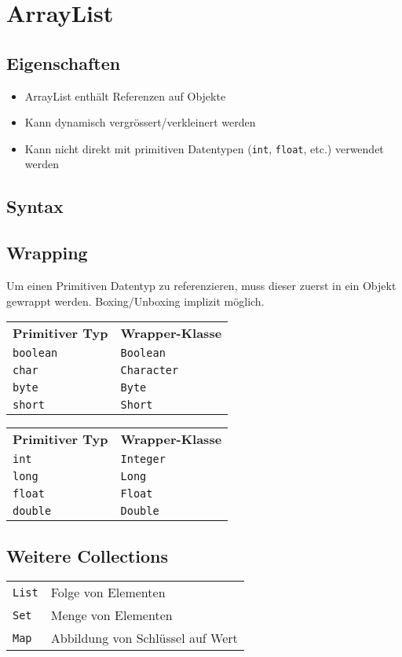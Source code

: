 \section{ArrayList}
\subsection{Eigenschaften}
\begin{itemize}
    \item ArrayList enthält Referenzen auf Objekte
    \item Kann dynamisch vergrössert/verkleinert werden
    \item Kann nicht direkt mit primitiven Datentypen (\lstinline{int}, \lstinline{float}, etc.) verwendet werden
\end{itemize}

\subsection{Syntax}



\subsection{Wrapping}
Um einen Primitiven Datentyp zu referenzieren, muss dieser zuerst in ein Objekt gewrappt werden.
Boxing/Unboxing implizit möglich.
\vspace{-0.5\abovedisplayskip}
\begin{center}
    \begin{tabularx}{0.45\columnwidth}{@{}l l@{}}
        \textbf{Primitiver Typ} & \textbf{Wrapper-Klasse}\\\hhline{==}
        \lstinline{boolean} & \lstinline{Boolean}\\\hhline{--}
        \lstinline{char} & \lstinline{Character}\\\hhline{--}
        \lstinline{byte} & \lstinline{Byte}\\\hhline{--}
        \lstinline{short} & \lstinline{Short}\\
    \end{tabularx}
    \begin{tabularx}{0.45\columnwidth}{@{}l l@{}}
        \textbf{Primitiver Typ} & \textbf{Wrapper-Klasse}\\\hhline{==}
        \lstinline{int} & \lstinline{Integer}\\\hhline{--}
        \lstinline{long} & \lstinline{Long}\\\hhline{--}
        \lstinline{float} & \lstinline{Float}\\\hhline{--}
        \lstinline{double} & \lstinline{Double}\\
    \end{tabularx}
\end{center}
\vspace{-0.5\belowdisplayskip}
    
\subsection{Weitere Collections}
\begin{tabular}{@{}l l@{}}
    \lstinline!List! &Folge von Elementen\\
    \lstinline!Set! &Menge von Elementen\\
    \lstinline!Map! &Abbildung von Schlüssel auf Wert
\end{tabular}
